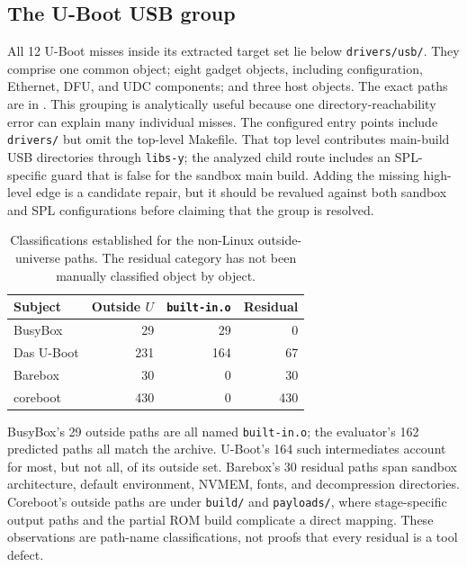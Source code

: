 \documentclass[acmsmall,screen,review]{acmart}
\begin{document}
\subsection{The U-Boot USB group}
All 12 U-Boot misses inside its extracted target set lie below \texttt{drivers/usb/}. They comprise one common object; eight gadget objects, including configuration, Ethernet, DFU, and UDC components; and three host objects. The exact paths are in . This grouping is analytically useful because one directory-reachability error can explain many individual misses. The configured entry points include \texttt{drivers/} but omit the top-level Makefile. That top level contributes main-build USB directories through \texttt{libs-y}; the analyzed child route includes an SPL-specific guard that is false for the sandbox main build. Adding the missing high-level edge is a candidate repair, but it should be revalued against both sandbox and SPL configurations before claiming that the group is resolved.

\begin{table}[t]
\centering\footnotesize
\caption{Classifications established for the non-Linux outside-universe paths. The residual category has not been manually classified object by object.}
\label{tab:outside-class}
\begin{tabular}{lrrr}
\toprule
Subject & Outside $U$ & \texttt{built-in.o} & Residual \\
\midrule
BusyBox & 29 & 29 & 0 \\
Das U-Boot & 231 & 164 & 67 \\
Barebox & 30 & 0 & 30 \\
coreboot & 430 & 0 & 430 \\
\bottomrule
\end{tabular}
\end{table}

BusyBox's 29 outside paths are all named \texttt{built-in.o}; the evaluator's 162 predicted paths all match the archive. U-Boot's 164 such intermediates account for most, but not all, of its outside set. Barebox's 30 residual paths span sandbox architecture, default environment, NVMEM, fonts, and decompression directories. Coreboot's outside paths are under \texttt{build/} and \texttt{payloads/}, where stage-specific output paths and the partial ROM build complicate a direct mapping. These observations are path-name classifications, not proofs that every residual is a tool defect.
\end{document}
